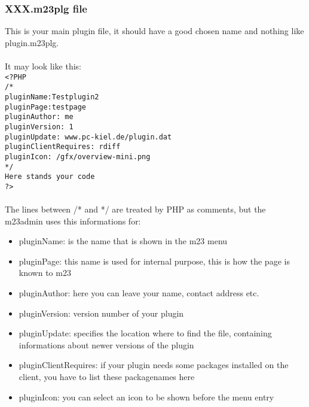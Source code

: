 \subsubsection{XXX.m23plg file}
This is your main plugin file, it should have a good chosen name and nothing like plugin.m23plg.\\\\
It may look like this:\\
\texttt{<?PHP\\
/*\\
pluginName:Testplugin2\\
pluginPage:testpage\\
pluginAuthor: me\\
pluginVersion: 1\\
pluginUpdate: www.pc-kiel.de/plugin.dat\\
pluginClientRequires: rdiff\\
pluginIcon: /gfx/overview-mini.png\\
*/\\
Here stands your code\\
?>}\\\\
The lines between /* and */ are treated by PHP as comments, but the m23admin uses this informations for:
\begin{itemize}
\item pluginName: is the name that is shown in the m23 menu
\item pluginPage: this name is used for internal purpose, this is how the page is known to m23
\item pluginAuthor: here you can leave your name, contact address etc.
\item pluginVersion: version number of your plugin
\item pluginUpdate: specifies the location where to find the file, containing informations about newer versions of the plugin
\item pluginClientRequires: if your plugin needs some packages installed on the client, you have to list these packagenames here
\item pluginIcon: you can select an icon to be shown before the menu entry
\end{itemize} 


